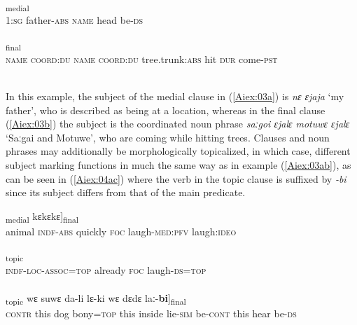 \documentclass[output=paper]{LSP/langsci}
\begin{document}
\begin{exe}
\ex \label{Aiex:03ab}
\begin{xlist}
\ex \label{Aiex:03a}
\textsubscript{medial}\\
\textsc{1}:\textsc{sg} father-\textsc{abs} \textsc{name} head be-\textsc{ds}\\
\glt {}\\
\ex \label{Aiex:03b}
\textsubscript{final}\\
‎\textsc{name} \textsc{coord}:\textsc{du} \textsc{name} \textsc{coord}:\textsc{du} tree.trunk:\textsc{abs} hit \textsc{dur} come-\textsc{pst}\\
\glt {}\\
\end{xlist}
\end{exe}

In this example, the subject of the medial clause in (\ref{Aiex:03a}) is \textit{nɛ ɛjaja} `my father', who is described as being at a location, whereas in the final clause (\ref{Aiex:03b}) the subject is the coordinated noun phrase \textit{saːgoi ɛjalɛ motuwɛ ɛjalɛ} `Saːgai and Motuwe', who are coming while hitting trees. Clauses and noun phrases may additionally be morphologically topicalized, in which case, different subject marking functions in much the same way as in example (\ref{Aiex:03ab}), as can be seen in (\ref{Aiex:04ac}) where the verb in the topic clause is suffixed by \textit{-bi} since its subject differs from that of the main predicate.

\begin{exe}
\ex \label{Aiex:04ac}
\begin{xlist}
\ex \label{Aiex:04a}
\gll [[na	no-wa ɛimɛ ka aɡlɛ-si]\textsubscript{medial} kɛkɛkɛ]\textsubscript{final}\\
animal	‎\textsc{indf}-‎\textsc{abs} quickly ‎\textsc{foc} laugh-‎\textsc{med}:‎\textsc{pfv} laugh:‎\textsc{ideo}\\
‎‎‎\glt {}\\
\ex \label{Aiex:04b}
\gll [no-wɛ-mi=jaː	ɛimɛ	ka	aɡlɛ-\textbf{bi}=jaː]\textsubscript{topic}\\
‎\textsc{indf}-‎\textsc{loc}-‎\textsc{assoc}=‎\textsc{top} already ‎\textsc{foc} laugh-‎\textsc{ds}=‎\textsc{top}\\
‎‎‎\glt {}\\
\ex \label{Aiex:04c}
\gll [[no	wɛ	aːɡɛ	kɛɡa=jaː]\textsubscript{topic}	wɛ	suwɛ	da-li	lɛ-ki	wɛ	dɛdɛ	laː-\textbf{bi}]\textsubscript{final}\\
\textsc{contr} this dog bony=‎\textsc{top} this inside lie-‎\textsc{sim} be-‎\textsc{cont} this hear be-‎\textsc{ds}\\
\glt {}\\
\end{xlist}
\end{exe}
\end{document}
